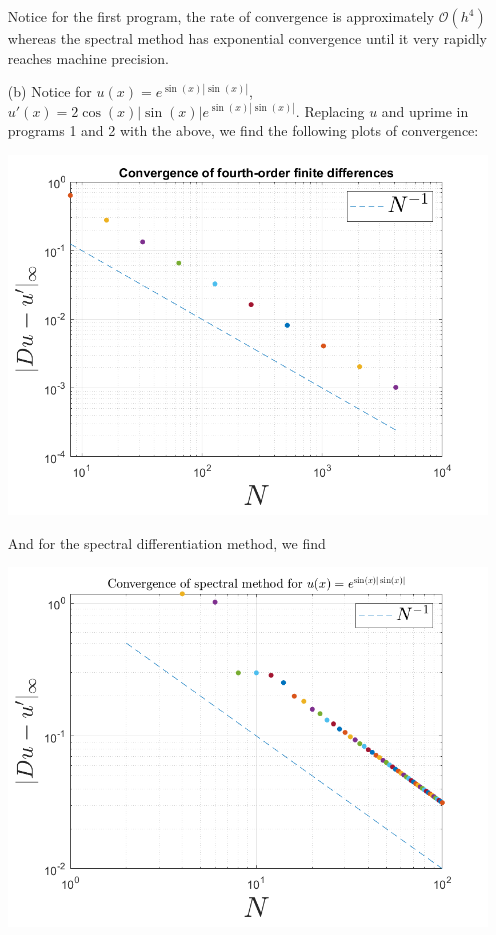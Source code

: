 \documentclass{article}
\begin{document}
\begin{itemize}
    Notice for the first program, the rate of convergence is approximately $\mathcal{O}(h^4)$ whereas the spectral method has exponential convergence until it very rapidly reaches machine precision.
    
    \item[(b)] Notice for $u(x) = e^{\sin(x)|\sin(x)|}$, $u'(x) = 2\cos(x)|\sin(x)|e^{\sin(x)|\sin(x)|}$. Replacing $u$ and uprime in programs 1 and 2 with the above, we find the following plots of convergence:
    \newline
    \begin{center}
        \includegraphics[scale = 0.4]{expsinabssin.png}
    \end{center}
    And for the spectral differentiation method, we find
    \begin{center}
        \includegraphics[scale = 0.4]{spectral expsinabssin.png}

\end{center}
\end{itemize}
\end{document}
